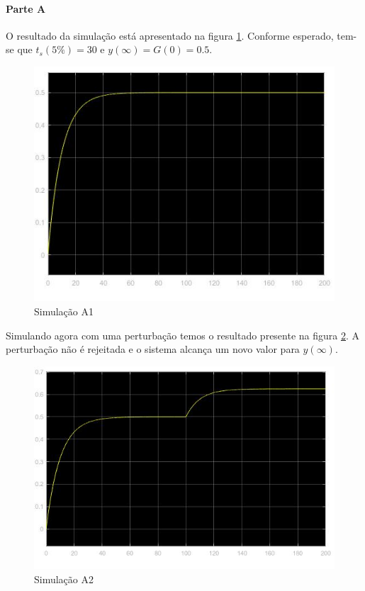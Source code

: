 \documentclass[
]{book}
\theoremstyle{definition}
\theoremstyle{definition}
\theoremstyle{definition}
\theoremstyle{remark}
\begin{document}
\hypertarget{parte-a-5}{%
\paragraph{Parte A}\label{parte-a-5}}

O resultado da simulação está apresentado na figura \ref{fig:prob1A1}. Conforme esperado, tem-se que \(t_s(5\%) = 30\) e \(y(\infty) = G(0) = 0.5\).

\begin{figure}

{\centering \includegraphics[width=0.8\linewidth]{Imagens/Lab5/Resolução/prob1A1} 

}

\caption{Simulação A1}\label{fig:prob1A1}
\end{figure}

Simulando agora com uma perturbação temos o resultado presente na figura \ref{fig:prob1A2}. A perturbação não é rejeitada e o sistema alcança um novo valor para \(y(\infty)\).

\begin{figure}

{\centering \includegraphics[width=0.8\linewidth]{Imagens/Lab5/Resolução/prob1A2} 

}

\caption{Simulação A2}\label{fig:prob1A2}
\end{figure}
\end{document}
